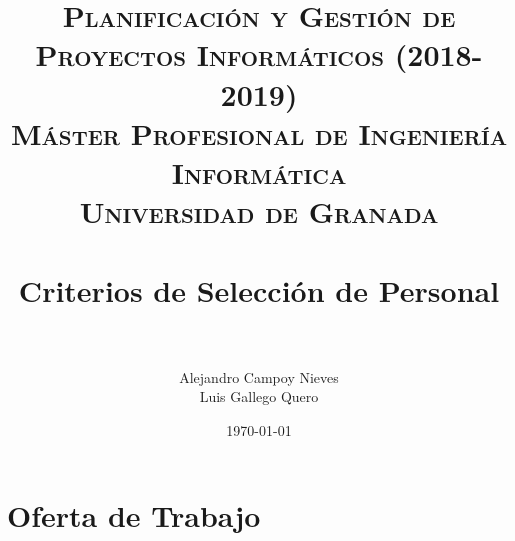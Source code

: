 

\title{	
	\normalfont \normalsize 
	\textsc{\textbf{Planificación y Gestión de Proyectos Informáticos (2018-2019)} \\ Máster Profesional de Ingeniería Informática \\ Universidad de Granada} \\ [25pt] %
	\horrule{0.5pt} \\[0.4cm] %
	\huge Criterios de Selección de Personal \\ %
	\horrule{2pt} \\[0.5cm] %
}

\author{Alejandro Campoy Nieves \\ Luis Gallego Quero} %
\date{\normalsize\today} %

\usepackage[spanish, es-tabla]{babel}
\usepackage{hyperref} %
\hypersetup{
	colorlinks=true,
	linkcolor=blue,
	filecolor=magenta,      
	urlcolor=blue,
}
\usepackage{graphicx}
\usepackage{amssymb, amsmath, amsbsy}
\usepackage{mathptmx}	
\usepackage{float}
\usepackage{booktabs}					%
\usepackage{eurosym}
\usepackage{xcolor}
\usepackage{colortbl}




	\maketitle %
	
	\newpage %
	
	\tableofcontents %
	
	
	\listoftables	
	
	\newpage	
 
\section{Oferta de Trabajo}

